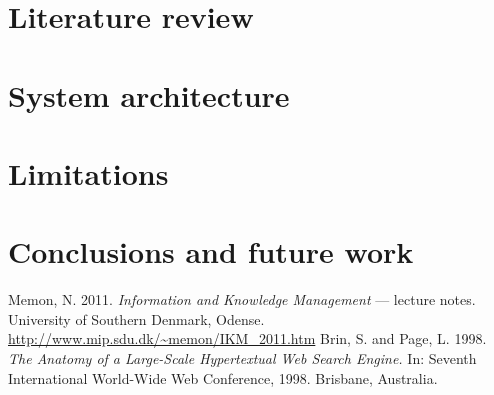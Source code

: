 \documentclass[a4paper]{article}
\begin{document}
\section{Literature review}
\section{System architecture}
\section{Limitations}

\section{Conclusions and future work}

\begin{thebibliography}{10}
Memon, N. 2011. \textsl{Information and Knowledge Management} --- lecture notes. University of Southern Denmark, Odense. \url{http://www.mip.sdu.dk/~memon/IKM_2011.htm}
 Brin, S. and Page, L. 1998. \textsl{The Anatomy of a Large-Scale Hypertextual Web Search Engine.} In: Seventh International World-Wide Web Conference, 1998. Brisbane, Australia.
\end{thebibliography}
\end{document}
